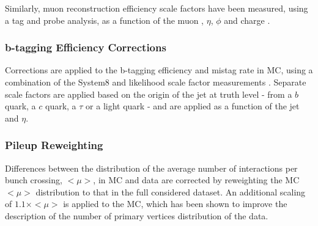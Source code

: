 Similarly, muon reconstruction efficiency scale factors
have been measured, using a \Zmumu tag and probe analysis, 
as a function of the muon \pt, $\eta$, $\phi$ and charge \cite{MuonSF}.

\subsubsection{b-tagging Efficiency Corrections}
\label{sec:presel:BTagEffCorr}

Corrections are applied to the b-tagging efficiency and mistag rate in
MC, using a combination of the System8 and likelihood scale
factor measurements \cite{BTagSF}. Separate scale factors are applied based on the origin of the jet at truth level - from a $b$ quark, a $c$ quark, a $\tau$ or a light quark - and are applied as a function of the jet \pt and $\eta$.

\subsubsection{Pileup Reweighting}
\label{sec:presel:PileupCorr}

Differences between the distribution of the average number of
interactions per bunch crossing, $<\mu>$, in MC and data are
corrected by reweighting the MC $<\mu>$ distribution to that in the
full considered dataset. An additional scaling of $1.1 \times <\mu>$
is applied to the MC, which has been shown to improve the description
of the number of primary vertices distribution of the data.
